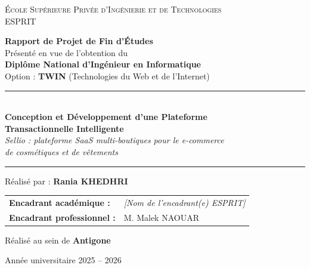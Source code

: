\begin{titlepage}
\thispagestyle{empty}
\begin{center}
\begin{minipage}{0.3\textwidth}
\raggedright{}
\end{minipage}\hfill
\begin{minipage}{0.3\textwidth}
\raggedleft{}
\end{minipage}

\vspace{1.2cm}
{\large \textsc{École Supérieure Privée d'Ingénierie et de Technologies}}\\[0.2cm]
{\large ESPRIT}

\vspace{1.2cm}
{\Large \textbf{Rapport de Projet de Fin d'Études}}\\[0.3cm]
{\large Présenté en vue de l'obtention du}\\[0.2cm]
{\large \textbf{Diplôme National d'Ingénieur en Informatique}}\\[0.2cm]
{\large Option : \textbf{TWIN} (Technologies du Web et de l'Internet)}

\vspace{1.2cm}
\rule{\textwidth}{1.2pt}\\[0.4cm]
{\LARGE \textbf{Conception et Développement d'une Plateforme\\[0.2cm] Transactionnelle Intelligente}}\\[0.4cm]
{\large \textit{Sellio : plateforme SaaS multi-boutiques pour le e-commerce\\ de cosmétiques et de vêtements}}\\[0.3cm]
\rule{\textwidth}{1.2pt}

\vspace{1.2cm}
{\large Réalisé par : \textbf{Rania KHEDHRI}}

\vspace{1cm}
\begin{tabular}{ll}
\textbf{Encadrant académique :} & \textit{[Nom de l'encadrant(e) ESPRIT]} \\[0.2cm]
\textbf{Encadrant professionnel :} & M. Malek NAOUAR \\
\end{tabular}

\vspace{1cm}
{\large Réalisé au sein de \textbf{Antigone}}

\vfill
{\large Année universitaire 2025 -- 2026}
\end{center}
\end{titlepage}

